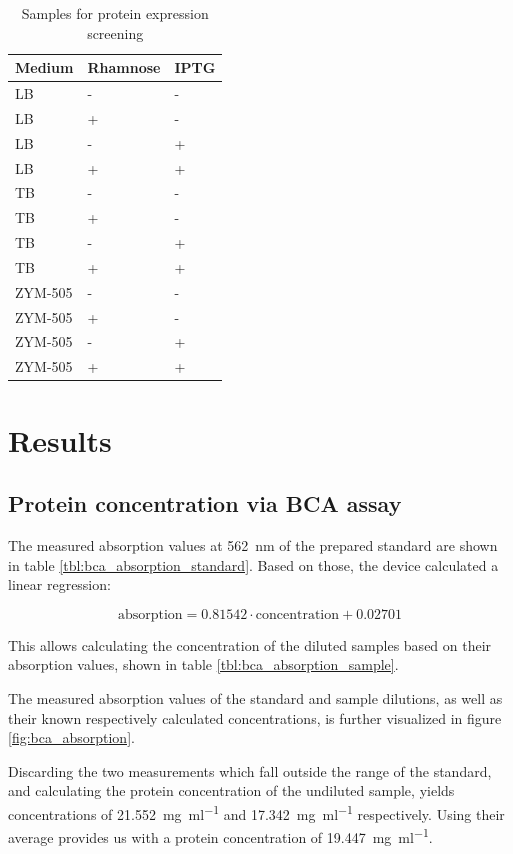 \documentclass[a4paper]{scrreprt}
\begin{document}
\begin{table}
	\centering
	\begin{tabu}{lll}
		\toprule
		Medium & Rhamnose & IPTG \\
		\midrule
		LB & - & - \\
		LB & + & - \\
		LB & - & + \\
		LB & + & + \\

		TB & - & - \\
		TB & + & - \\
		TB & - & + \\
		TB & + & + \\

		ZYM-505 & - & - \\
		ZYM-505 & + & - \\
		ZYM-505 & - & + \\
		ZYM-505 & + & + \\
		\bottomrule
	\end{tabu}
	\caption{Samples for protein expression screening}
	\label{tbl:expression_samples}
\end{table}

\chapter{Results}

\section{Protein concentration via BCA assay}

The measured absorption values at \SI{562}{\nm} of the prepared standard are
shown in table \ref{tbl:bca_absorption_standard}. Based on those, the device
calculated a linear regression:

\[
	\text{absorption} = 0.81542 \cdot \text{concentration} + 0.02701
\]

This allows calculating the concentration of the diluted samples based on their
absorption values, shown in table \ref{tbl:bca_absorption_sample}.

The measured absorption values of the standard and sample dilutions, as well as
their known respectively calculated concentrations, is further visualized in
figure \ref{fig:bca_absorption}.

Discarding the two measurements which fall outside the range of the standard,
and calculating the protein concentration of the undiluted sample, yields
concentrations of \SI{21.552}{\mg\per\ml} and \SI{17.342}{\mg\per\ml}
respectively. Using their average provides us with a protein concentration of
\SI{19.447}{\mg\per\ml}.
\end{document}
